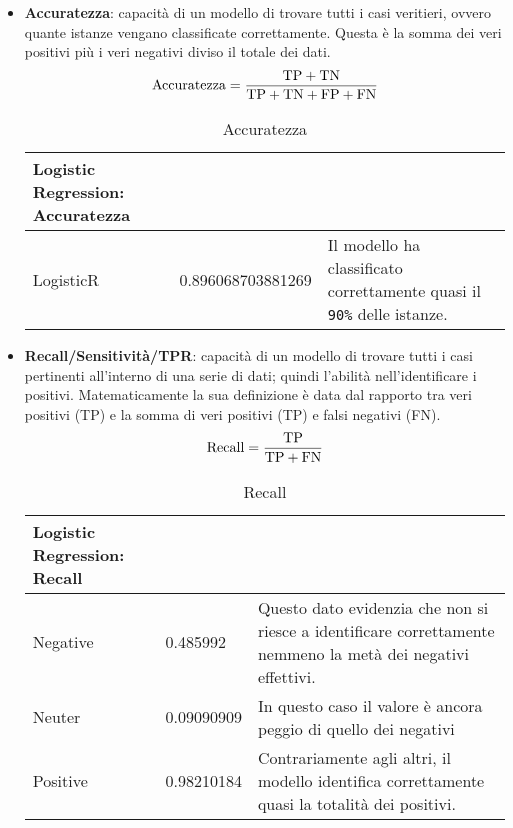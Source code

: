 \begin{itemize}
				\item \textbf{Accuratezza}: capacità di un modello di trovare tutti i casi veritieri, ovvero quante istanze vengano classificate correttamente. Questa è la somma dei veri positivi più i veri negativi diviso il totale dei dati.
					\begin{equation}
					\text{Accuratezza} = \frac{\text{TP} + \text{TN}}{\text{TP} + \text{TN} + \text{FP} + \text{FN}} \\
					\end{equation}
					
					\begin{table} [H]
						\caption{Accuratezza}
						\label{tab:accLogisticRegression}
						\centering
						\begin{tabular}{llp{}}
							\toprule 
							\textbf{Logistic Regression: Accuratezza}	\\
							\midrule
							LogisticR  & 0.896068703881269 & Il modello ha classificato correttamente quasi il \verb|90%| delle istanze.\\
							\bottomrule
						\end{tabular}
					\end{table}
				
				\item \textbf{Recall/Sensitività/TPR}: capacità di un modello di trovare tutti i casi pertinenti all’interno di una serie di dati; quindi l'abilità nell'identificare i positivi. Matematicamente la sua definizione è data dal rapporto tra veri positivi (TP) e la somma di veri positivi (TP) e falsi negativi (FN).
					\begin{equation}
					\text{Recall} = \frac{\text{TP}}{\text{TP} + \text{FN}} \\
					\end{equation}
					
					\begin{table} [H]
						\caption{Recall}
						\label{tab:RecallLogisticRegression}
						\centering
						\begin{tabular}{llp{}}
							\toprule 
							\textbf{Logistic Regression: Recall}	\\
							\midrule
							Negative  & 0.485992  & Questo dato evidenzia che non si riesce a identificare correttamente nemmeno la metà dei negativi effettivi.\\
							Neuter & 0.09090909 & In questo caso il valore è ancora peggio di quello dei negativi\\
							Positive & 0.98210184 & Contrariamente agli altri, il modello identifica correttamente quasi la totalità dei positivi.\\
							\bottomrule
						\end{tabular}
					\end{table}
				

\end{itemize}
